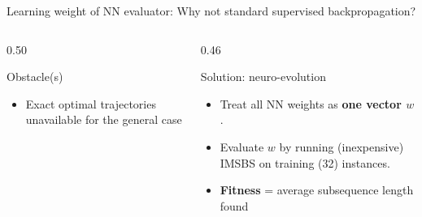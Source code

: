 \documentclass{beamer}
\begin{document}
\begin{frame}{Learning weight of NN evaluator: Why not standard supervised backpropagation?}
\begin{columns}[T,totalwidth=\textwidth]
\begin{column}{0.50\textwidth}
\begin{block}{Obstacle(s)}
\begin{itemize}
  
  \item Exact optimal trajectories unavailable for the general case

\end{itemize}
\end{block}
\end{column}
\begin{column}{0.46\textwidth}
\begin{block}{Solution: neuro-evolution}
\begin{itemize}
  \item Treat all NN weights as \textbf{one vector $w$}.
  \item Evaluate $w$ by running (inexpensive) IMSBS on training (32) instances.
  \item \textbf{Fitness} = average subsequence length found
\end{itemize}
\end{block}
\end{column}
\end{columns}
\end{frame}
\end{document}
